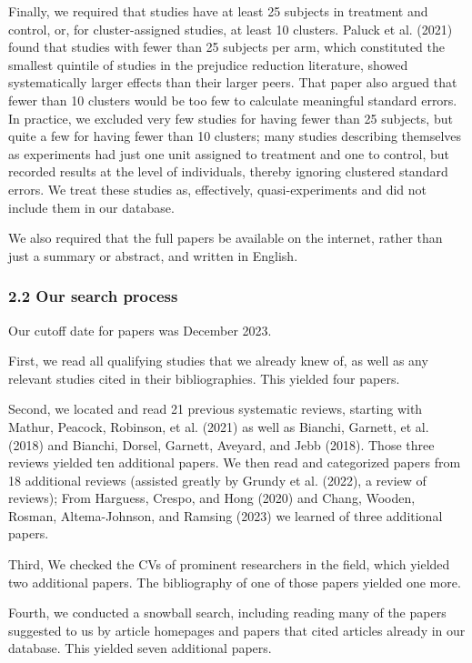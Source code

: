 \documentclass[
  man]{apa6}
\begin{document}
Finally, we required that studies have at least 25 subjects in treatment and control, or, for cluster-assigned studies, at least 10 clusters. Paluck et al. (2021) found that studies with fewer than 25 subjects per arm, which constituted the smallest quintile of studies in the prejudice reduction literature, showed systematically larger effects than their larger peers. That paper also argued that fewer than 10 clusters would be too few to calculate meaningful standard errors. In practice, we excluded very few studies for having fewer than 25 subjects, but quite a few for having fewer than 10 clusters; many studies describing themselves as experiments had just one unit assigned to treatment and one to control, but recorded results at the level of individuals, thereby ignoring clustered standard errors. We treat these studies as, effectively, quasi-experiments and did not include them in our database.

We also required that the full papers be available on the internet, rather than just a summary or abstract, and written in English.

\subsubsection{2.2 Our search process}\label{our-search-process}

Our cutoff date for papers was December 2023.

First, we read all qualifying studies that we already knew of, as well as any relevant studies cited in their bibliographies. This yielded four papers.

Second, we located and read 21 previous systematic reviews, starting with Mathur, Peacock, Robinson, et al. (2021) as well as Bianchi, Garnett, et al. (2018) and Bianchi, Dorsel, Garnett, Aveyard, and Jebb (2018). Those three reviews yielded ten additional papers. We then read and categorized papers from 18 additional reviews (assisted greatly by Grundy et al. (2022), a review of reviews); From Harguess, Crespo, and Hong (2020) and Chang, Wooden, Rosman, Altema-Johnson, and Ramsing (2023) we learned of three additional papers.

Third, We checked the CVs of prominent researchers in the field, which yielded two additional papers. The bibliography of one of those papers yielded one more.

Fourth, we conducted a snowball search, including reading many of the papers suggested to us by article homepages and papers that cited articles already in our database. This yielded seven additional papers.
\end{document}
